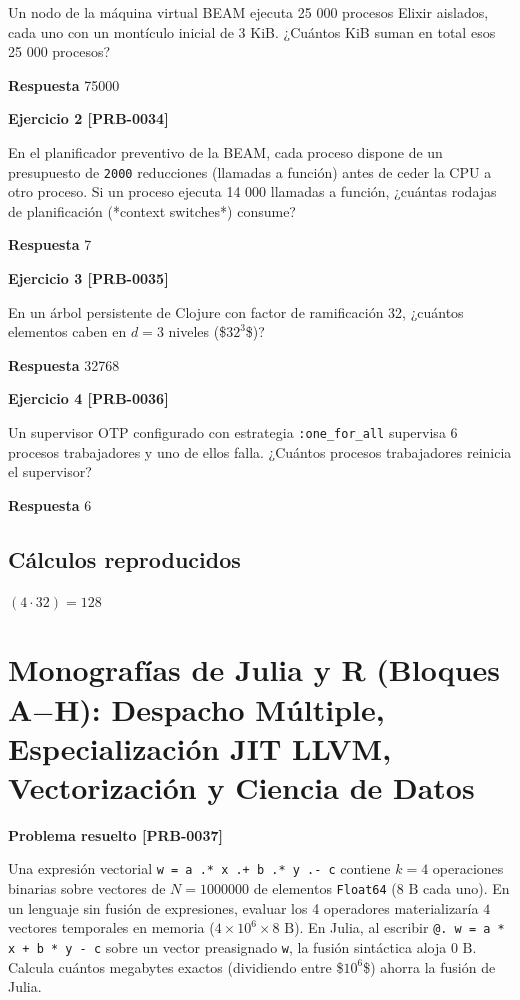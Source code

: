 \documentclass{book}
\begin{document}
Un nodo de la máquina virtual BEAM ejecuta 25 000 procesos Elixir aislados, cada uno con un montículo inicial de 3 KiB. ¿Cuántos KiB suman en total esos 25 000 procesos?

\noindent\textbf{Respuesta} 75000

\noindent\textbf{Ejercicio 2 [PRB-0034]}

En el planificador preventivo de la BEAM, cada proceso dispone de un presupuesto de \texttt{2000} reducciones (llamadas a función) antes de ceder la CPU a otro proceso. Si un proceso ejecuta 14 000 llamadas a función, ¿cuántas rodajas de planificación (*context switches*) consume?

\noindent\textbf{Respuesta} 7

\noindent\textbf{Ejercicio 3 [PRB-0035]}

En un árbol persistente de Clojure con factor de ramificación 32, ¿cuántos elementos caben en \(d = 3\) niveles (\$\(32^3\)\$)?

\noindent\textbf{Respuesta} 32768

\noindent\textbf{Ejercicio 4 [PRB-0036]}

Un supervisor OTP configurado con estrategia \texttt{:one\_for\_all} supervisa 6 procesos trabajadores y uno de ellos falla. ¿Cuántos procesos trabajadores reinicia el supervisor?

\noindent\textbf{Respuesta} 6

\subsection*{Cálculos reproducidos}

\(\left(4\cdot 32\right) = 128\)

\section{Monografías de Julia y R (Bloques A\(-\)H): Despacho Múltiple, Especialización JIT LLVM, Vectorización y Ciencia de Datos}

\noindent\textbf{Problema resuelto [PRB-0037]}

Una expresión vectorial \texttt{w = a .* x .+ b .* y .- c} contiene \(k = 4\) operaciones binarias sobre vectores de \(N = 1000000\) de elementos \texttt{Float64} (\(8\text{ B}\) cada uno). En un lenguaje sin fusión de expresiones, evaluar los 4 operadores materializaría \(4\) vectores temporales en memoria (\(4 \times 10^6 \times 8\text{ B}\)). En Julia, al escribir \texttt{@. w = a * x + b * y - c} sobre un vector preasignado \texttt{w}, la fusión sintáctica aloja \(0\text{ B}\). Calcula cuántos megabytes exactos (dividiendo entre \$\(10^6\)\$) ahorra la fusión de Julia.
\end{document}
